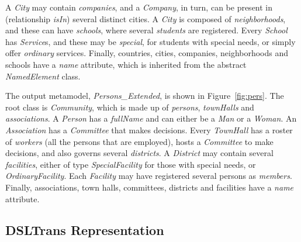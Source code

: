 A \emph{City} may contain \emph{companies}, and a \emph{Company}, in turn, can be present in (relationship \emph{isIn}) several distinct cities.
A \emph{City} is composed of \emph{neighborhoods}, and these can have \emph{schools}, where several \emph{students} are registered.
Every \emph{School} has \emph{Service}s, and these may be \emph{special}, for students with special needs, or simply offer \emph{ordinary} services.
Finally, countries, cities, companies, neighborhoods and schools have a \emph{name} attribute, which is inherited from the abstract \emph{NamedElement} class.

The output metamodel, \emph{Persons\_Extended}, is shown in Figure~\ref{fig:pers}.
The root class is \emph{Community}, which is made up of \emph{persons}, \emph{townHalls} and \emph{associations}.
A \emph{Person} has a \emph{fullName} and can either be a \emph{Man} or a \emph{Woman}.
An \emph{Association} has a \emph{Committee} that makes decisions.
Every \emph{TownHall} has a roster of \emph{workers} (all the persons that are employed), hosts a \emph{Committee} to make decisions, and also governs several \emph{districts}.
A \emph{District} may contain several \emph{facilities}, either of type \emph{SpecialFacility} for those with special needs, or \emph{OrdinaryFacility}.
Each \emph{Facility} may have registered several persons as \emph{members}.
Finally, associations, town halls, committees, districts and facilities have a \emph{name} attribute.


\subsection{DSLTrans Representation}\label{sec:DSLTransRepresentation}

